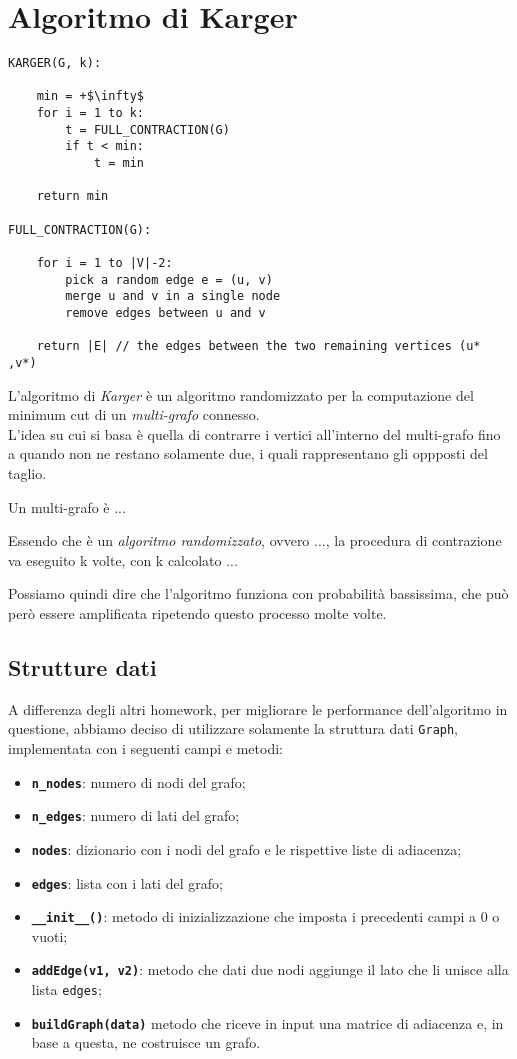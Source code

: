 \section{Algoritmo di Karger}\label{karger}
\begin{lstlisting}[mathescape=true]
KARGER(G, k):

	min = +$\infty$
	for i = 1 to k:		
		t = FULL_CONTRACTION(G)		
		if t < min:
			t = min
			
	return min

FULL_CONTRACTION(G):

	for i = 1 to |V|-2:
		pick a random edge e = (u, v)
		merge u and v in a single node
		remove edges between u and v
		
	return |E| // the edges between the two remaining vertices (u* ,v*)
\end{lstlisting}	

L'algoritmo di \textit{Karger} è un algoritmo randomizzato per la computazione del minimum cut di un \textit{multi-grafo} connesso.\\
L'idea su cui si basa è quella di contrarre i vertici all'interno del multi-grafo fino a quando non ne restano solamente due, i quali rappresentano gli oppposti del taglio.

Un multi-grafo è ...

Essendo che è un \textit{algoritmo randomizzato}, ovvero ..., la procedura di contrazione va eseguito k volte, con k calcolato ...

Possiamo quindi dire che l'algoritmo funziona con probabilità bassissima, che può però essere amplificata ripetendo questo processo molte volte.


\subsection{Strutture dati}

	A differenza degli altri homework, per migliorare le performance dell'algoritmo in questione, abbiamo deciso di utilizzare solamente la struttura dati \texttt{Graph}, implementata con i seguenti campi e metodi:
	\begin{itemize}
		\item \texttt{\textbf{n\_nodes}}: numero di nodi del grafo;
		\item \texttt{\textbf{n\_edges}}: numero di lati del grafo;
		\item \texttt{\textbf{nodes}}: dizionario con i nodi del grafo e le rispettive liste di adiacenza;
		\item \texttt{\textbf{edges}}: lista con i lati del grafo;
		\item \texttt{\textbf{\_\_init\_\_()}}: metodo di inizializzazione che imposta i precedenti campi a 0 o vuoti;
		\item \texttt{\textbf{addEdge(v1, v2)}}: metodo che dati due nodi aggiunge il lato che li unisce alla lista \texttt{edges};
		\item \texttt{\textbf{buildGraph(data)}} metodo che riceve in input una matrice di adiacenza e, in base a questa, ne costruisce un grafo.
	\end{itemize}
	
